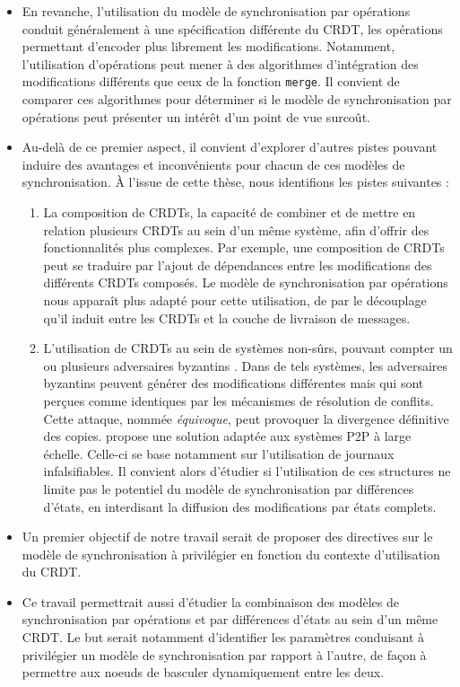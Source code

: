 \begin{itemize}
  \item En revanche, l'utilisation du modèle de synchronisation par opérations conduit généralement à une spécification différente du \ac{CRDT}, les opérations permettant d'encoder plus librement les modifications.
    Notamment, l'utilisation d'opérations peut mener à des algorithmes d'intégration des modifications différents que ceux de la fonction \texttt{merge}.
    Il convient de comparer ces algorithmes pour déterminer si le modèle de synchronisation par opérations peut présenter un intérêt d'un point de vue surcoût.
  \item Au-delà de ce premier aspect, il convient d'explorer d'autres pistes pouvant induire des avantages et inconvénients pour chacun de ces modèles de synchronisation.
    À l'issue de cette thèse, nous identifions les pistes suivantes :
    \begin{enumerate}
      \item La composition de \acp{CRDT}, \ie la capacité de combiner et de mettre en relation plusieurs \acp{CRDT} au sein d'un même système, afin d'offrir des fonctionnalités plus complexes.
        Par exemple, une composition de \acp{CRDT} peut se traduire par l'ajout de dépendances entre les modifications des différents \acp{CRDT} composés.
        Le modèle de synchronisation par opérations nous apparaît plus adapté pour cette utilisation, de par le découplage qu'il induit entre les \acp{CRDT} et la couche de livraison de messages.
      \item L'utilisation de \acp{CRDT} au sein de systèmes non-sûrs, \ie pouvant compter un ou plusieurs adversaires byzantins \cite{2019-byzantine-generals-problem-lamport}.
        Dans de tels systèmes, les adversaires byzantins peuvent générer des modifications différentes mais qui sont perçues comme identiques par les mécanismes de résolution de conflits.
        Cette attaque, nommée \emph{équivoque}, peut provoquer la divergence définitive des copies.
        \cite{2018-prunable-authenticated-log-vic} propose une solution adaptée aux systèmes \ac{P2P} à large échelle.
        Celle-ci se base notamment sur l'utilisation de journaux infalsifiables.
        Il convient alors d'étudier si l'utilisation de ces structures ne limite pas le potentiel du modèle de synchronisation par différences d'états, \eg en interdisant la diffusion des modifications par états complets.
    \end{enumerate}
  \item Un premier objectif de notre travail serait de proposer des directives sur le modèle de synchronisation à privilégier en fonction du contexte d'utilisation du \ac{CRDT}.
  \item Ce travail permettrait aussi d'étudier la combinaison des modèles de synchronisation par opérations et par différences d'états au sein d'un même \ac{CRDT}.
    Le but serait notamment d'identifier les paramètres conduisant à privilégier un modèle de synchronisation par rapport à l'autre, de façon à permettre aux noeuds de basculer dynamiquement entre les deux.
\end{itemize}
